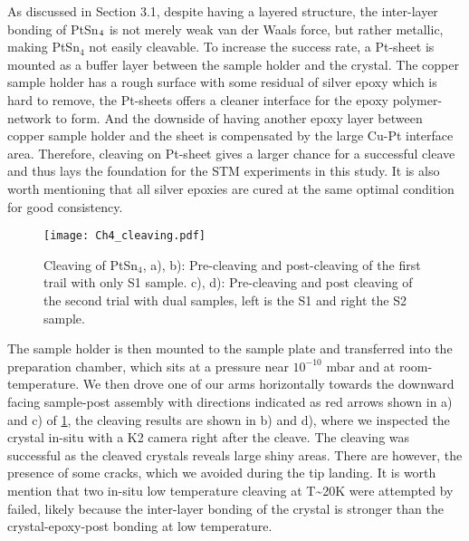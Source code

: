 \par As discussed in Section 3.1, despite having a layered structure, the inter-layer bonding of PtSn$\textsubscript{4}$ is not merely weak van der Waals force, but rather metallic, making PtSn$_4$ not easily cleavable. To increase the success rate, a Pt-sheet is mounted as a buffer layer between the sample holder and the crystal. The copper sample holder has a rough surface with some residual of silver epoxy which is hard to remove, the Pt-sheets offers a cleaner interface for the epoxy polymer-network to form. And the downside of having another epoxy layer between copper sample holder and the sheet is compensated by the large Cu-Pt interface area. Therefore, cleaving on Pt-sheet gives a larger chance for a successful cleave and thus lays the foundation for the \ac{STM} experiments in this study. It is also worth mentioning that all silver epoxies are cured at the same optimal condition for good consistency. 

\begin{figure}
	\centering
	\texttt{[image: Ch4\_cleaving.pdf]}
	\caption{Cleaving of PtSn$_4$, a), b): Pre-cleaving and post-cleaving of the first trail with only S1 sample. c), d): Pre-cleaving and post cleaving of the second trial with dual samples, left is the S1 and right the S2 sample. }
	\label{fig:ch4_cleaves}
\end{figure}

\par The sample holder is then mounted to the sample plate and transferred into the preparation chamber, which sits at a pressure near $10^{-10}$ mbar and at room-temperature. We then drove one of our arms horizontally towards the downward facing sample-post assembly with directions indicated as red arrows shown in a) and c) of \ref{fig:ch4_cleaves}, the cleaving results are shown in b) and d), where we inspected the crystal in-situ with a K2 camera right after the cleave. The cleaving was successful as the cleaved crystals reveals large shiny areas. There are however, the presence of some cracks, which we avoided during the tip landing. It is worth mention that two in-situ low temperature cleaving at T\textasciitilde 20K were attempted by failed, likely because the inter-layer bonding of the crystal is stronger than the crystal-epoxy-post bonding at low temperature.

